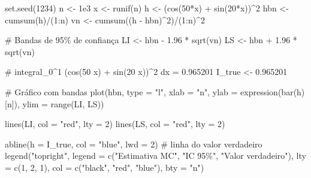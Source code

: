 \documentclass[
  letterpaper,
  DIV=11,
  numbers=noendperiod]{scrreprt}
\newenvironment{Shaded}{\begin{snugshade}}{\end{snugshade}}
\newcommand{\AttributeTok}[1]{\textcolor[rgb]{0.40,0.45,0.13}{#1}}
\newcommand{\CommentTok}[1]{\textcolor[rgb]{0.37,0.37,0.37}{#1}}
\newcommand{\DecValTok}[1]{\textcolor[rgb]{0.68,0.00,0.00}{#1}}
\newcommand{\FloatTok}[1]{\textcolor[rgb]{0.68,0.00,0.00}{#1}}
\newcommand{\FunctionTok}[1]{\textcolor[rgb]{0.28,0.35,0.67}{#1}}
\newcommand{\NormalTok}[1]{\textcolor[rgb]{0.00,0.23,0.31}{#1}}
\newcommand{\OtherTok}[1]{\textcolor[rgb]{0.00,0.23,0.31}{#1}}
\newcommand{\SpecialCharTok}[1]{\textcolor[rgb]{0.37,0.37,0.37}{#1}}
\newcommand{\StringTok}[1]{\textcolor[rgb]{0.13,0.47,0.30}{#1}}
\begin{document}
\begin{Shaded}
\begin{Highlighting}[]
\FunctionTok{set.seed}\NormalTok{(}\DecValTok{1234}\NormalTok{)}
\NormalTok{n }\OtherTok{\textless{}{-}} \FloatTok{1e3}
\NormalTok{x }\OtherTok{\textless{}{-}} \FunctionTok{runif}\NormalTok{(n)}
\NormalTok{h }\OtherTok{\textless{}{-}}\NormalTok{ (}\FunctionTok{cos}\NormalTok{(}\DecValTok{50}\SpecialCharTok{*}\NormalTok{x) }\SpecialCharTok{+} \FunctionTok{sin}\NormalTok{(}\DecValTok{20}\SpecialCharTok{*}\NormalTok{x))}\SpecialCharTok{\^{}}\DecValTok{2}
\NormalTok{hbn }\OtherTok{\textless{}{-}} \FunctionTok{cumsum}\NormalTok{(h)}\SpecialCharTok{/}\NormalTok{(}\DecValTok{1}\SpecialCharTok{:}\NormalTok{n)}
\NormalTok{vn  }\OtherTok{\textless{}{-}} \FunctionTok{cumsum}\NormalTok{((h }\SpecialCharTok{{-}}\NormalTok{ hbn)}\SpecialCharTok{\^{}}\DecValTok{2}\NormalTok{)}\SpecialCharTok{/}\NormalTok{(}\DecValTok{1}\SpecialCharTok{:}\NormalTok{n)}\SpecialCharTok{\^{}}\DecValTok{2}

\CommentTok{\# Bandas de 95\% de confiança}
\NormalTok{LI }\OtherTok{\textless{}{-}}\NormalTok{ hbn }\SpecialCharTok{{-}} \FloatTok{1.96} \SpecialCharTok{*} \FunctionTok{sqrt}\NormalTok{(vn)}
\NormalTok{LS }\OtherTok{\textless{}{-}}\NormalTok{ hbn }\SpecialCharTok{+} \FloatTok{1.96} \SpecialCharTok{*} \FunctionTok{sqrt}\NormalTok{(vn)}


\CommentTok{\# integral\_0\^{}1 (cos(50 x) + sin(20 x))\^{}2 dx = 0.965201}
\NormalTok{I\_true }\OtherTok{\textless{}{-}} \FloatTok{0.965201}

\CommentTok{\# Gráfico com bandas}
\FunctionTok{plot}\NormalTok{(hbn, }\AttributeTok{type =} \StringTok{"l"}\NormalTok{, }\AttributeTok{xlab =} \StringTok{"n"}\NormalTok{,}
     \AttributeTok{ylab =} \FunctionTok{expression}\NormalTok{(}\FunctionTok{bar}\NormalTok{(h)[n]),}
     \AttributeTok{ylim =} \FunctionTok{range}\NormalTok{(LI, LS))}

\FunctionTok{lines}\NormalTok{(LI, }\AttributeTok{col =} \StringTok{"red"}\NormalTok{, }\AttributeTok{lty =} \DecValTok{2}\NormalTok{)}
\FunctionTok{lines}\NormalTok{(LS, }\AttributeTok{col =} \StringTok{"red"}\NormalTok{, }\AttributeTok{lty =} \DecValTok{2}\NormalTok{)}

\FunctionTok{abline}\NormalTok{(}\AttributeTok{h =}\NormalTok{ I\_true, }\AttributeTok{col =} \StringTok{"blue"}\NormalTok{, }\AttributeTok{lwd =} \DecValTok{2}\NormalTok{)  }\CommentTok{\# linha do valor verdadeiro}
\FunctionTok{legend}\NormalTok{(}\StringTok{"topright"}\NormalTok{,}
       \AttributeTok{legend =} \FunctionTok{c}\NormalTok{(}\StringTok{"Estimativa MC"}\NormalTok{, }\StringTok{"IC 95\%"}\NormalTok{, }\StringTok{"Valor verdadeiro"}\NormalTok{),}
       \AttributeTok{lty =} \FunctionTok{c}\NormalTok{(}\DecValTok{1}\NormalTok{, }\DecValTok{2}\NormalTok{, }\DecValTok{1}\NormalTok{),}
       \AttributeTok{col =} \FunctionTok{c}\NormalTok{(}\StringTok{"black"}\NormalTok{, }\StringTok{"red"}\NormalTok{, }\StringTok{"blue"}\NormalTok{),}
       \AttributeTok{bty =} \StringTok{"n"}\NormalTok{)}
\end{Highlighting}
\end{Shaded}
\end{document}
